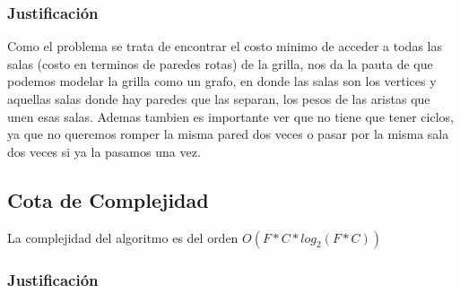  
\subsubsection{Justificaci\'on}

Como el problema se trata de encontrar el costo minimo de acceder a todas las salas (costo en terminos de paredes rotas) de la grilla, nos da la pauta de que podemos modelar la grilla como un grafo, en donde las salas son los vertices y aquellas salas donde hay paredes que las separan, los pesos de las aristas que unen esas salas.
Ademas tambien es importante ver que no tiene que tener ciclos, ya que no queremos romper la misma pared dos veces o pasar por la misma sala dos veces si ya la pasamos una vez.

\subsection{Cota de Complejidad}

%
%
%
%
%
%

La complejidad del algoritmo es del orden  $O(F*C*log_2(F*C))$

\subsubsection{Justificaci\'on}

